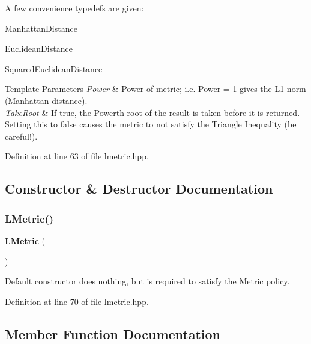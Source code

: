 A few convenience typedefs are given\+:


\begin{DoxyItemize}
\item Manhattan\+Distance
\item Euclidean\+Distance
\item Squared\+Euclidean\+Distance
\end{DoxyItemize}


\begin{DoxyTemplParams}{Template Parameters}
{\em Power} & Power of metric; i.\+e. Power = 1 gives the L1-\/norm (Manhattan distance). \\
\hline
{\em Take\+Root} & If true, the Power\textquotesingle{}th root of the result is taken before it is returned. Setting this to false causes the metric to not satisfy the Triangle Inequality (be careful!). \\
\hline
\end{DoxyTemplParams}


Definition at line 63 of file lmetric.\+hpp.



\subsection{Constructor \& Destructor Documentation}
\mbox{\label{classmlpack_1_1metric_1_1LMetric_ad296b4c8538551ddcef38a49d0842ca7}} 
\subsubsection{L\+Metric()}
{\footnotesize\ttfamily \textbf{ L\+Metric} (\begin{DoxyParamCaption}{ }\end{DoxyParamCaption})\hspace{0.3cm}{\ttfamily [inline]}}



Default constructor does nothing, but is required to satisfy the Metric policy. 



Definition at line 70 of file lmetric.\+hpp.



\subsection{Member Function Documentation}
\mbox{\label{classmlpack_1_1metric_1_1LMetric_af39380107875eb94f0efef7d37cc57df}} 
